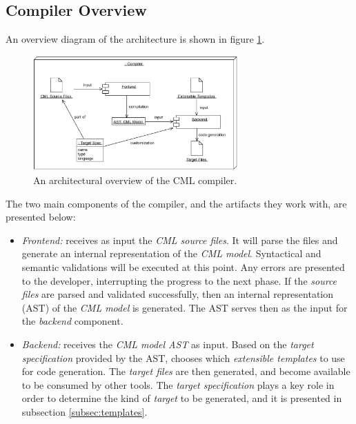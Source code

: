 \subsection{Compiler Overview}\label{subsec:overview}

An overview diagram of the architecture is shown in figure \ref{fig:overview}.

\begin{figure}
\centering
\includegraphics[width=0.7\textwidth]{compiler/figure-overview}
\caption{An architectural overview of the CML compiler.}
\label{fig:overview}
\end{figure}

The two main components of the compiler,
and the artifacts they work with,
are presented below:

\begin{itemize}

\item \emph{Frontend:} receives as input the \emph{CML source files}.
It will parse the files and generate an internal representation of the \emph{CML model}.
Syntactical and semantic validations will be executed at this point.
Any errors are presented to the developer, interrupting the progress to the next phase.
If the \emph{source files} are parsed and validated successfully, then an internal representation (AST) of the \emph{CML model} is generated.
The AST serves then as the input for the \emph{backend} component.

\item \emph{Backend:} receives the \emph{CML model AST} as input.
Based on the \emph{target specification} provided by the AST, chooses which \emph{extensible templates} to use for code generation.
The \emph{target files} are then generated, and become available to be consumed by other tools. The \emph{target specification} plays a key role in order to determine the kind of \emph{target} to be generated, and it is presented in subsection \ref{subsec:templates}.

\end{itemize}
